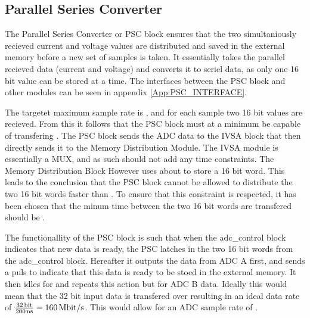 \subsection{Parallel Series Converter} \label{subsec:PSC}
The Parallel Series Converter or PSC block ensures that the two simultaniously recieved current and voltage values are distributed and saved in the external memory before a new set of samples is taken. It essentially takes the parallel recieved data (current and voltage) and converts it to seriel data, as only one 16 bit value can be stored at a time. The interfaces between the PSC block and other modules can be seen in appendix \ref{App:PSC_INTERFACE}.

The targetet maximum sample rate is , and for each sample two 16 bit values are recieved. From this it follows that the PSC block must at a minimum be capable of transfering . The PSC block sends the ADC data to the IVSA block that then directly sends it to the Memory Distribution Module. The IVSA module is essentially a MUX, and as such should not add any time constraints. The Memory Distribution Block However uses about  to store a 16 bit word. This leads to the conclusion that the PSC block cannot be allowed to distribute the two 16 bit words faster than . To ensure that this constraint is respected, it has been chosen that the minum time between the two 16 bit words are transfered should be .

The functionallity of the PSC block is such that when the adc\_control block indicates that new data is ready, the PSC latches in the two 16 bit words from the adc\_control block. Hereafter it outputs the data from ADC A first, and sends a puls to indicate that this data is ready to be stoed in the external memory. It then idles for  and repeats this action but for ADC B data. Ideally this would mean that the 32 bit input data is transfered over  resulting in an ideal data rate of $\frac{\SIQ{32}{\bit}}{\SIQ{200}{\nano\second}} = \SIQ{160}{\mega\bit/\second}$. This would allow for an ADC sample rate of .

